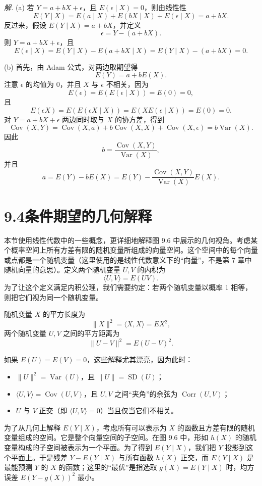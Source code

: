 \documentclass[UTF8,12pt,a4paper,fontset=fandol]{ctexart}
\begin{document}
\noindent\textit{解.}\quad
(a) 若 $Y=a+bX+\epsilon$，且 $E(\epsilon\mid X)=0$，则由线性性
\[
  E(Y\mid X)=E(a\mid X)+E(bX\mid X)+E(\epsilon\mid X)=a+bX.
\]
反过来，假设 $E(Y\mid X)=a+bX$，并定义
\[
  \epsilon=Y-(a+bX).
\]
则 $Y=a+bX+\epsilon$，且
\[
  E(\epsilon\mid X)=E(Y\mid X)-E(a+bX\mid X)=E(Y\mid X)-(a+bX)=0.
\]

(b) 首先，由 Adam 公式，对两边取期望得
\[
  E(Y)=a+bE(X).
\]
注意 $\epsilon$ 的均值为 $0$，并且 $X$ 与 $\epsilon$ 不相关，因为
\[
  E(\epsilon)=E(E(\epsilon\mid X))=E(0)=0,
\]
且
\[
  E(\epsilon X)=E(E(\epsilon X\mid X))=E(XE(\epsilon\mid X))=E(0)=0.
\]
对 $Y=a+bX+\epsilon$ 两边同时取与 $X$ 的协方差，得到
\[
  \operatorname{Cov}(X,Y)
  =\operatorname{Cov}(X,a)+b\operatorname{Cov}(X,X)+\operatorname{Cov}(X,\epsilon)
  =b\operatorname{Var}(X).
\]
因此
\[
  b=\frac{\operatorname{Cov}(X,Y)}{\operatorname{Var}(X)},
\]
并且
\[
  a=E(Y)-bE(X)
  =E(Y)-\frac{\operatorname{Cov}(X,Y)}{\operatorname{Var}(X)}E(X).
\]

\section*{9.4\quad *条件期望的几何解释}

本节使用线性代数中的一些概念，更详细地解释图 9.6 中展示的几何视角。考虑某个概率空间上所有方差有限的随机变量所组成的向量空间。这个空间中的每个向量或点都是一个随机变量（这里使用的是线性代数意义下的“向量”，不是第 7 章中随机向量的意思）。定义两个随机变量 $U,V$ 的内积为
\[
  \langle U,V\rangle=E(UV).
\]
为了让这个定义满足内积公理，我们需要约定：若两个随机变量以概率 $1$ 相等，则把它们视为同一个随机变量。

随机变量 $X$ 的平方长度为
\[
  \|X\|^2=\langle X,X\rangle=EX^2,
\]
两个随机变量 $U,V$ 之间的平方距离为
\[
  \|U-V\|^2=E(U-V)^2.
\]

如果 $E(U)=E(V)=0$，这些解释尤其漂亮，因为此时：
\begin{itemize}
  \item $\|U\|^2=\operatorname{Var}(U)$，且 $\|U\|=\operatorname{SD}(U)$；
  \item $\langle U,V\rangle=\operatorname{Cov}(U,V)$，且 $U,V$ 之间“夹角”的余弦为 $\operatorname{Corr}(U,V)$；
  \item $U$ 与 $V$ 正交（即 $\langle U,V\rangle=0$）当且仅当它们不相关。
\end{itemize}

为了从几何上解释 $E(Y\mid X)$，考虑所有可以表示为 $X$ 的函数且方差有限的随机变量组成的空间。它是整个向量空间的子空间。在图 9.6 中，形如 $h(X)$ 的随机变量构成的子空间被表示为一个平面。为了得到 $E(Y\mid X)$，我们把 $Y$ 投影到这个平面上。于是残差 $Y-E(Y\mid X)$ 与所有函数 $h(X)$ 正交，而 $E(Y\mid X)$ 是最能预测 $Y$ 的 $X$ 的函数；这里的“最优”是指选取 $g(X)=E(Y\mid X)$ 时，均方误差 $E(Y-g(X))^2$ 最小。
\end{document}

